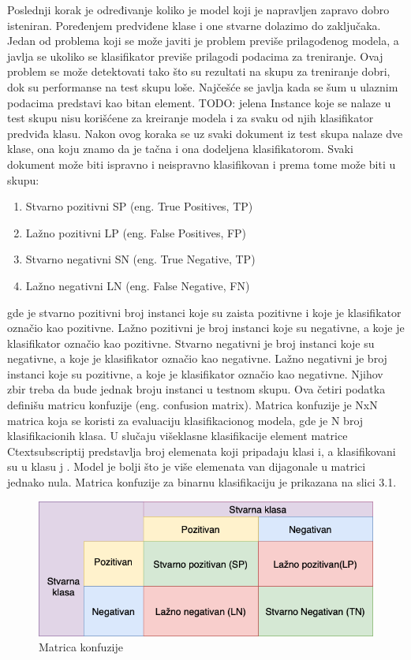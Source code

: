 \documentclass[12pt,oneside]{memoir}
\begin{document}
Poslednji korak je određivanje koliko je model koji je napravljen zapravo dobro isteniran.  Poređenjem predviđene klase i one stvarne dolazimo do zaključaka.  Jedan od problema koji se može javiti je problem previše prilagođenog modela,  a javlja se ukoliko se klasifikator previše prilagodi podacima za treniranje.  Ovaj problem se može detektovati tako što su rezultati na skupu za treniranje dobri, dok su performanse na test skupu loše.  Najčešće se javlja kada se šum u ulaznim podacima predstavi kao bitan element.  TODO: jelena
Instance koje se nalaze u test skupu nisu korišćene za kreiranje modela i za svaku od njih klasifikator predviđa klasu.  Nakon ovog koraka se uz svaki dokument iz test skupa nalaze dve klase,  ona koju znamo da je tačna i ona dodeljena klasifikatorom.  Svaki dokument može biti ispravno i neispravno klasifikovan i prema tome može biti u skupu:

\begin{enumerate}
\item Stvarno pozitivni SP (eng. True Positives, TP)
\item Lažno pozitivni LP (eng.  False Positives,  FP)
\item Stvarno negativni SN (eng.  True Negative, TP)
\item Lažno negativni LN (eng.  False Negative, FN)
\end{enumerate}

gde je stvarno pozitivni broj instanci koje su zaista pozitivne i koje je klasifikator označio kao pozitivne.  Lažno pozitivni je broj instanci koje su negativne, a koje je klasifikator označio kao pozitivne.  Stvarno negativni je broj instanci koje su negativne,  a koje je klasifikator označio kao negativne.  Lažno negativni je broj instanci koje su pozitivne, a koje je klasifikator označio kao negativne.  Njihov zbir treba da bude jednak broju instanci u testnom skupu.
Ova četiri podatka definišu matricu konfuzije (eng. confusion matrix).  Matrica konfuzije je NxN matrica koja se koristi za evaluaciju klasifikacionog modela,  gde je N broj klasifikacionih klasa.  U slučaju višeklasne klasifikacije element matrice Ctextsubscript{ij} predstavlja broj elemenata koji pripadaju klasi i, a klasifikovani su u klasu j \cite{MarijaMR}.  Model je bolji što je više elemenata van dijagonale u matrici jednako nula.  Matrica konfuzije za binarnu klasifikaciju je prikazana na slici 3.1.

\begin{figure}[h!]
\centering
\includegraphics[width=.7\textwidth]{images/confusionMatrix.png}
\caption{Matrica konfuzije}
\label{Slika}
\end{figure}
\end{document}
